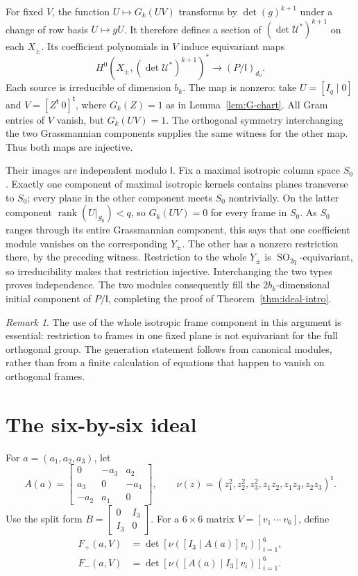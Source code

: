 \documentclass[11pt]{article}
\theoremstyle{definition}
\theoremstyle{remark}
\newtheorem{remark}[theorem]{Remark}
\numberwithin{equation}{section}
\DeclareMathOperator{\rank}{rank}
\DeclareMathOperator{\SO}{SO}
\newcommand{\UU}{\mathcal U}
\newcommand{\II}{\mathsf I}
\begin{document}
For fixed $V$, the function $U\mapsto G_k(UV)$ transforms by
$\det(g)^{k+1}$ under a change of row basis $U\mapsto gU$.
It therefore defines a section of $(\det\UU^*)^{k+1}$ on each
$X_\pm$. Its coefficient polynomials in $V$ induce equivariant maps
\begin{equation}\label{eq:coefficient-map}
 H^0(X_\pm,(\det\UU^*)^{k+1})^*\longrightarrow(P/\II)_{d_0}.
\end{equation}
Each source is irreducible of dimension $b_k$. The map is nonzero:
take $U=[I_q\mid0]$ and $V=[Z^{\mathsf t}\ 0]^{\mathsf t}$, where
$G_k(Z)=1$ as in Lemma~\ref{lem:G-chart}. All Gram entries of $V$
vanish, but $G_k(UV)=1$. The orthogonal symmetry interchanging the
two Grassmannian components supplies the same witness for the other
map. Thus both maps are injective.

Their images are independent modulo $\II$. Fix a maximal isotropic
column space $S_0$. Exactly one component of maximal isotropic kernels
contains planes transverse to $S_0$; every plane in the other component
meets $S_0$ nontrivially. On the latter component $\rank(U|_{S_0})<q$,
so $G_k(UV)=0$ for every frame in $S_0$. As $S_0$ ranges through its
entire Grassmannian component, this says that one coefficient module
vanishes on the corresponding $Y_\pm$. The other has a nonzero
restriction there, by the preceding witness. Restriction to the whole
$Y_\pm$ is $\SO_{2q}$-equivariant, so irreducibility makes that
restriction injective. Interchanging the two types proves independence.
The two modules consequently fill the $2b_k$-dimensional initial
component of $P/\II$, completing the proof of
Theorem~\ref{thm:ideal-intro}.

\begin{remark}
The use of the whole isotropic frame component in this argument is
essential: restriction to frames in one fixed plane is not equivariant
for the full orthogonal group. The generation statement follows from
canonical modules, rather than from a finite calculation of equations
that happen to vanish on orthogonal frames.
\end{remark}

\section{The six-by-six ideal}\label{sec:six}

For $a=(a_1,a_2,a_3)$, let
\[
 A(a)=\begin{bmatrix}
 0&-a_3&a_2\\a_3&0&-a_1\\-a_2&a_1&0
 \end{bmatrix},\qquad
 \nu(z)=(z_1^2,z_2^2,z_3^2,z_1z_2,z_1z_3,z_2z_3)^{\mathsf t}.
\]
Use the split form $B=\left[\begin{smallmatrix}0&I_3\\I_3&0\end{smallmatrix}\right]$.
For a $6\times6$ matrix $V=[v_1\ \cdots\ v_6]$, define
\begin{align}
 F_+(a,V)&=\det[\nu([I_3\mid A(a)]v_i)]_{i=1}^6,\label{eq:sixplus}\\
 F_-(a,V)&=\det[\nu([A(a)\mid I_3]v_i)]_{i=1}^6.\label{eq:sixminus}
\end{align}
\end{document}
